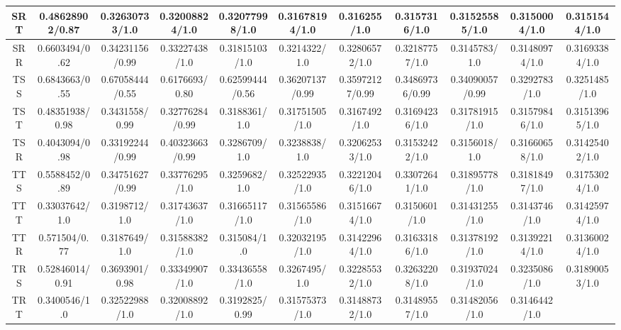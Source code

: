 \documentclass{article}
\begin{document}
\begin{table}[H]
{\begin{tabular}{|c|c|c|c|c|c|c|c|c|c|c|}
        \hline
        SRT & 0.48628902/0.87 & 
0.32630733/1.0 & 
0.32008824/1.0 & 
0.32077998/1.0 & 
0.31678194/1.0 & 
0.316255/1.0 & 
0.3157316/1.0 & 
0.31525585/1.0 & 
\cellcolor{blue!25} 0.3150004/1.0 & 
0.3151544/1.0  \\
        \hline
        SRR & 0.6603494/0.62 & 
0.34231156/0.99 & 
0.33227438/1.0 & 
0.31815103/1.0 & 
0.3214322/1.0 & 
0.32806572/1.0 & 
0.32187757/1.0 & 
\cellcolor{blue!25} 0.3145783/1.0 & 
0.31480974/1.0 & 
0.31693384/1.0  \\
        \hline
        TSS & 0.6843663/0.55 & 
0.67058444/0.55 & 
0.6176693/0.80 & 
0.62599444/0.56 & 
0.36207137/0.99 & 
0.35972127/0.99 & 
0.34869736/0.99 & 
0.34090057/0.99 & 
0.3292783/1.0 & 
\cellcolor{blue!25} 0.3251485/1.0  \\
        \hline
        TST & 0.48351938/0.98 & 
0.3431558/0.99 & 
0.32776284/0.99 & 
0.3188361/1.0 & 
0.31751505/1.0 & 
0.3167492/1.0 & 
0.31694236/1.0 & 
0.31781915/1.0 & 
0.31579846/1.0 & 
\cellcolor{blue!25} 0.31513965/1.0  \\
        \hline
        TSR & 0.4043094/0.98 & 
0.33192244/0.99 & 
0.40323663/0.99 & 
0.3286709/1.0 & 
0.3238838/1.0 & 
0.32062533/1.0 & 
0.31532422/1.0 & 
0.3156018/1.0 & 
0.31660658/1.0 & 
\cellcolor{blue!25} 0.31425402/1.0  \\
        \hline
        TTS & 0.5588452/0.89 & 
0.34751627/0.99 & 
0.33776295/1.0 & 
0.3259682/1.0 & 
0.32522935/1.0 & 
0.32212046/1.0 & 
0.33072641/1.0 & 
0.31895778/1.0 & 
0.31818497/1.0 & 
\cellcolor{blue!25} 0.31753024/1.0  \\
        \hline
        TTT & 0.33037642/1.0 & 
0.3198712/1.0 & 
0.31743637/1.0 & 
0.31665117/1.0 & 
0.31565586/1.0 & 
0.31516674/1.0 & 
0.3150601/1.0 & 
0.31431255/1.0 & 
0.3143746/1.0 & 
\cellcolor{blue!25} 0.31425974/1.0 \\
        \hline
        TTR & 0.571504/0.77 & 
0.3187649/1.0 & 
0.31588382/1.0 & 
0.315084/1.0 & 
0.32032195/1.0 & 
0.31422964/1.0 & 
0.31633186/1.0 & 
0.31378192/1.0 & 
0.31392214/1.0 & 
\cellcolor{blue!25} 0.31360024/1.0  \\
        \hline
        TRS & 0.52846014/0.91 & 
0.3693901/0.98 & 
0.33349907/1.0 & 
0.33436558/1.0 & 
0.3267495/1.0 & 
0.32285532/1.0 & 
0.32632208/1.0 & 
0.31937024/1.0 & 
0.3235086/1.0 & 
\cellcolor{blue!25} 0.31890053/1.0  \\
        \hline
        TRT & 0.3400546/1.0 & 
0.32522988/1.0 & 
0.32008892/1.0 & 
0.3192825/0.99 & 
0.31575373/1.0 & 
0.31488732/1.0 & 
0.31489557/1.0 & 
0.31482056/1.0 & 
\cellcolor{blue!25} 0.3146442/1.0 & 

\end{tabular}}
\end{table}
\end{document}
